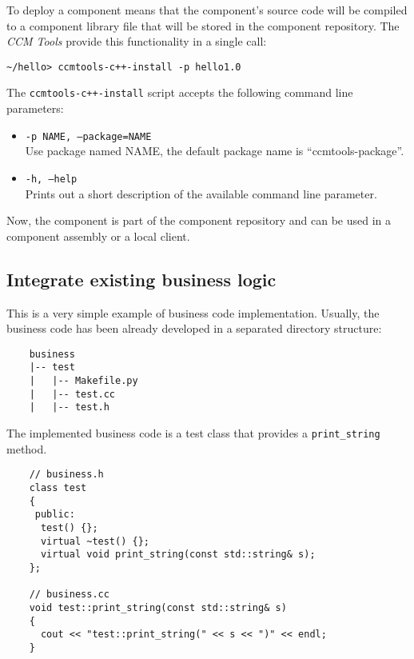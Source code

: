 To deploy a component means that the component's source code will be compiled
to a component library file that will be stored in the component repository.
The {\it CCM Tools} provide this functionality in a single call:
\begin{verbatim}
~/hello> ccmtools-c++-install -p hello1.0
\end{verbatim}
The {\tt ccmtools-c++-install} script accepts the following command line parameters:
\begin{itemize}
\item {\tt -p NAME, --package=NAME}\\
Use package named NAME, the default package name is ``ccmtools-package''.

\item {\tt -h, --help}\\
Prints out a short description of the available command line parameter.
\end{itemize}

\noindent
Now, the component is part of the component repository and can be used in
a component assembly or a local client.


\subsection{Integrate existing business logic}




This is a very simple example of business code implementation.
Usually, the business code has been already developed in a separated directory 
structure:
\begin{verbatim}
    business
    |-- test
    |   |-- Makefile.py
    |   |-- test.cc
    |   |-- test.h
\end{verbatim}

\noindent
The implemented business code is a test class that provides a 
{\tt print\_string} method.
\begin{verbatim}
    // business.h	
    class test 
    {
     public:
      test() {};
      virtual ~test() {};
      virtual void print_string(const std::string& s);
    };

    // business.cc
    void test::print_string(const std::string& s)
    {
      cout << "test::print_string(" << s << ")" << endl;
    }
\end{verbatim}


